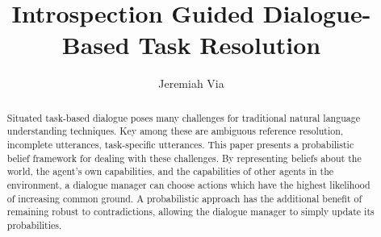 \documentclass[12pt]{article}
\title{Introspection Guided Dialogue-Based Task Resolution}
\author{Jeremiah Via}
\begin{document}
\maketitle

\begin{abstract}
  Situated task-based dialogue poses many challenges for traditional
  natural language understanding techniques. Key among these are
  ambiguous reference resolution, incomplete utterances, task-specific
  utterances. This paper presents a probabilistic belief framework for
  dealing with these challenges. By representing beliefs about the
  world, the agent's own capabilities, and the capabilities of other
  agents in the environment, a dialogue manager can choose actions
  which have the highest likelihood of increasing common ground. A
  probabilistic approach has the additional benefit of remaining
  robust to contradictions, allowing the dialogue manager to simply
  update its probabilities.
\end{abstract}
\end{document}
